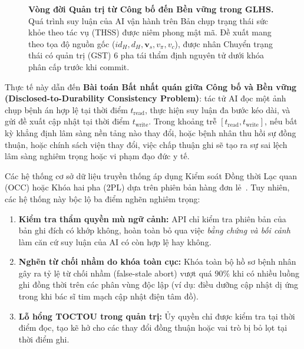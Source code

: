 \documentclass[11pt,a4paper]{article}
\begin{document}
\begin{figure}[H]
\caption{\textbf{Vòng đời Quản trị từ Công bố đến Bền vững trong GLHS.} Quá trình suy luận của AI vận hành trên Bản chụp trạng thái sức khỏe theo tác vụ (THSS) được niêm phong mật mã. Đề xuất mang theo tọa độ nguồn gốc ($id_H, d_H, \mathbf{v}_s, v_{\pi}, v_c$), được nhân Chuyển trạng thái có quản trị (GST) 6 pha tái thẩm định nguyên tử dưới khóa phân cấp trước khi commit.}
\label{fig:lifecycle}
\end{figure}

Thực tế này dẫn đến \textbf{Bài toán Bất nhất quán giữa Công bố và Bền vững (Disclosed-to-Durability Consistency Problem)}: tác tử AI đọc một ảnh chụp bệnh án hợp lệ tại thời điểm $t_{\text{read}}$, thực hiện suy luận đa bước kéo dài, và gửi đề xuất cập nhật tại thời điểm $t_{\text{write}}$. Trong khoảng trễ $[t_{\text{read}}, t_{\text{write}}]$, nếu bất kỳ khẳng định lâm sàng nền tảng nào thay đổi, hoặc bệnh nhân thu hồi sự đồng thuận, hoặc chính sách viện thay đổi, việc chấp thuận ghi sẽ tạo ra sự sai lệch lâm sàng nghiêm trọng hoặc vi phạm đạo đức y tế.

Các hệ thống cơ sở dữ liệu truyền thống áp dụng Kiểm soát Đồng thời Lạc quan (OCC) hoặc Khóa hai pha (2PL) dựa trên phiên bản hàng đơn lẻ~\cite{kumar1998,statefulgov}. Tuy nhiên, các hệ thống này bộc lộ ba điểm nghẽn nghiêm trọng:
\begin{enumerate}[leftmargin=1.8em]
  \item \textbf{Kiểm tra thẩm quyền mù ngữ cảnh:} API chỉ kiểm tra phiên bản của bản ghi đích có khớp không, hoàn toàn bỏ qua việc \emph{bằng chứng và bối cảnh} làm căn cứ suy luận của AI có còn hợp lệ hay không.
  \item \textbf{Nghẽn từ chối nhầm do khóa toàn cục:} Khóa toàn bộ hồ sơ bệnh nhân gây ra tỷ lệ từ chối nhầm (false-stale abort) vượt quá $90\%$ khi có nhiều luồng ghi đồng thời trên các phân vùng độc lập (ví dụ: điều dưỡng cập nhật dị ứng trong khi bác sĩ tim mạch cập nhật điện tâm đồ).
  \item \textbf{Lỗ hổng TOCTOU trong quản trị:} Ủy quyền chỉ được kiểm tra tại thời điểm đọc, tạo kẽ hở cho các thay đổi đồng thuận hoặc vai trò bị bỏ lọt tại thời điểm ghi.
\end{enumerate}
\end{document}
